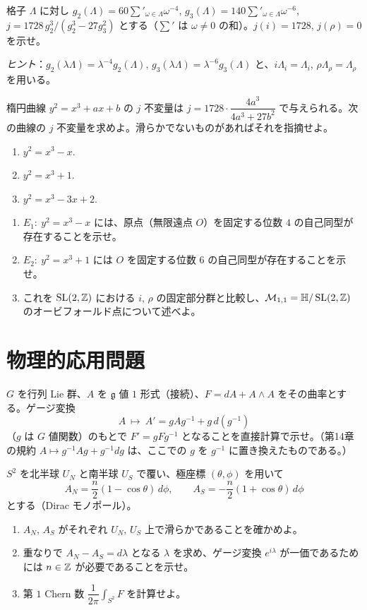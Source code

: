 格子 $\Lambda$ に対し $g_2(\Lambda)=60\sum'_{\omega\in\Lambda}\omega^{-4}$, $g_3(\Lambda)=140\sum'_{\omega\in\Lambda}\omega^{-6}$,
$j=1728\,g_2^3/(g_2^3-27g_3^2)$ とする（$\sum'$ は $\omega\neq0$ の和）。$j(i)=1728$, $j(\rho)=0$ を示せ。

\noindent\emph{ヒント}：$g_2(\lambda\Lambda)=\lambda^{-4}g_2(\Lambda)$, $g_3(\lambda\Lambda)=\lambda^{-6}g_3(\Lambda)$ と、$i\Lambda_i=\Lambda_i$, $\rho\Lambda_\rho=\Lambda_\rho$ を用いる。

楕円曲線 $y^2=x^3+ax+b$ の $j$ 不変量は $j=1728\cdot\dfrac{4a^3}{4a^3+27b^2}$ で与えられる。次の曲線の $j$ 不変量を求めよ。滑らかでないものがあればそれを指摘せよ。
\begin{enumerate}
  \item $y^2=x^3-x$.
  \item $y^2=x^3+1$.
  \item $y^2=x^3-3x+2$.
\end{enumerate}

\begin{enumerate}
  \item $E_1:\ y^2=x^3-x$ には、原点（無限遠点 $O$）を固定する位数 $4$ の自己同型が存在することを示せ。
  \item $E_2:\ y^2=x^3+1$ には $O$ を固定する位数 $6$ の自己同型が存在することを示せ。
  \item これを $\operatorname{SL}(2,\mathbb{Z})$ における $i$, $\rho$ の固定部分群と比較し、$\mathcal{M}_{1,1}=\mathbb{H}/\operatorname{SL}(2,\mathbb{Z})$ のオービフォールド点について述べよ。
\end{enumerate}

\section{物理的応用問題}

$G$ を行列 Lie 群、$A$ を $\mathfrak{g}$ 値 $1$ 形式（接続）、$F=dA+A\wedge A$ をその曲率とする。ゲージ変換
\[
  A\ \longmapsto\ A'=gAg^{-1}+g\,d(g^{-1})
\]
（$g$ は $G$ 値関数）のもとで $F'=gFg^{-1}$ となることを直接計算で示せ。（第14章の規約 $A\mapsto g^{-1}Ag+g^{-1}dg$ は、ここでの $g$ を $g^{-1}$ に置き換えたものである。）

$S^2$ を北半球 $U_N$ と南半球 $U_S$ で覆い、極座標 $(\theta,\phi)$ を用いて
\[
  A_N=\frac n2(1-\cos\theta)\,d\phi,\qquad A_S=-\frac n2(1+\cos\theta)\,d\phi
\]
とする（Dirac モノポール）。
\begin{enumerate}
  \item $A_N$, $A_S$ がそれぞれ $U_N$, $U_S$ 上で滑らかであることを確かめよ。
  \item 重なりで $A_N-A_S=d\lambda$ となる $\lambda$ を求め、ゲージ変換 $e^{i\lambda}$ が一価であるためには $n\in\mathbb{Z}$ が必要であることを示せ。
  \item 第 $1$ Chern 数 $\dfrac{1}{2\pi}\displaystyle\int_{S^2}F$ を計算せよ。
\end{enumerate}

